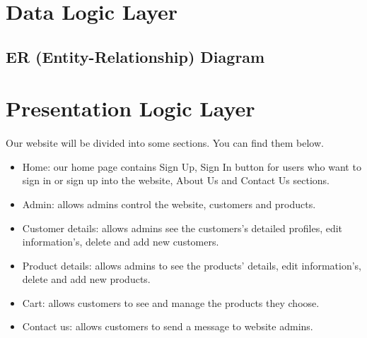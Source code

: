 \documentclass[12pt]{article}
\begin{document}
\section{Data Logic Layer}
\bigskip
\paragraph{} 
\subsection{ER (Entity-Relationship) Diagram}

\newpage
\section{Presentation Logic Layer}
\bigskip
\paragraph{} 
Our website will be divided into some sections. You can find them below. 
\begin{itemize}

    \item Home: our home page contains Sign Up, Sign In button for users who want to sign in or sign up into the website, About Us and Contact Us sections.
    
    
    \item Admin: allows admins control the website, customers and products. 
    \item Customer details: allows admins see the customers's detailed profiles, edit information's, delete and add new customers.  
    
    
    \item Product details: allows admins to see the products' details, edit information's, delete and add new products. 
    
    
    \item Cart: allows customers to see and manage the products they choose. 	
    \item Contact us: allows customers to send a message to website admins. 
\end{itemize}
\end{document}
